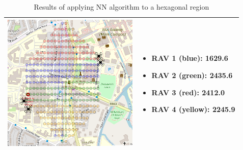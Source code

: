 \begin{table}[h!]
\begin{tabular}{ | c | m{5cm} | }
    \begin{minipage}[c][68mm][c]{.6\textwidth}
      \includegraphics[width=\linewidth, height=66mm]{Chapters/MultiAgentCoverage/MultipleTravellingSalesman/Figs/Hexagon/FourRAV.PNG}
    \end{minipage}
    &
    \begin{itemize}[leftmargin=*]
    \item[] RAV 1 (blue): 1629.6
    \item[] RAV 2 (green): 2435.6
    \item[] RAV 3 (red): 2412.0
    \item[] RAV 4 (yellow): 2245.9
    \end{itemize}
    \\
    \hline
  \end{tabular}
  \caption{Results of applying NN algorithm to a hexagonal region}\label{table:NNAlgoResultsHex}
\end{table}


